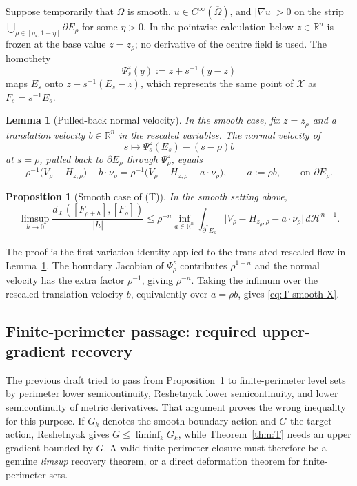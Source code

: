 \documentclass[11pt]{article}
\newtheorem{proposition}[theorem]{Proposition}
\newtheorem{lemma}[theorem]{Lemma}
\theoremstyle{definition}
\newcommand{\R}{\mathbb{R}}
\newcommand{\Om}{\Omega}
\newcommand{\rstar}{\rho_{*}}
\newcommand{\X}{\mathcal X}
\begin{document}
Suppose temporarily that $\Om$ is smooth, $u\in C^\infty(\overline{\Om})$,
and $|\nabla u|>0$ on the strip
$\bigcup_{\rho\in[\rstar,1-\eta]}\partial E_\rho$ for some $\eta>0$.  In the
pointwise calculation below $z\in\R^n$ is frozen at the base value
$z=z_\rho$; no derivative of the centre field is used.  The homothety
\[
   \Psi_s^z(y):=z+s^{-1}(y-z)
\]
maps $E_s$ onto $z+s^{-1}(E_s-z)$, which represents the same point of $\X$ as
$F_s=s^{-1}E_s$.

\begin{lemma}[Pulled-back normal velocity]\label{lem:W}
In the smooth case, fix $z=z_\rho$ and a translation velocity
$b\in\R^n$ in the rescaled variables.  The normal velocity of
\[
   s\longmapsto \Psi_s^z(E_s)-(s-\rho)b
\]
at $s=\rho$, pulled back to $\partial E_\rho$ through $\Psi_\rho^z$, equals
\begin{equation}\label{eq:W}
   \rho^{-1}\bigl(V_\rho-H_{z,\rho}\bigr)-b\cdot\nu_\rho
   =
   \rho^{-1}\bigl(V_\rho-H_{z,\rho}-a\cdot\nu_\rho\bigr),
   \qquad a:=\rho b,
   \qquad\text{on }\partial E_\rho.
\end{equation}
\end{lemma}

\begin{proposition}[Smooth case of (T)]\label{prop:T-smooth}
In the smooth setting above,
\begin{equation}\label{eq:T-smooth-X}
   \limsup_{h\to 0}\frac{d_\X([F_{\rho+h}],[F_\rho])}{|h|}
   \le \rho^{-n}\inf_{a\in\R^n}\int_{\partial^*E_\rho}
       \bigl|V_\rho-H_{z_\rho,\rho}-a\cdot\nu_\rho\bigr|\,d\mathcal H^{n-1}.
\end{equation}
\end{proposition}

The proof is the first-variation identity \cite[\S17.3]{Maggi2012}
applied to the translated rescaled flow in Lemma~\ref{lem:W}.  The boundary
Jacobian of $\Psi_\rho^z$ contributes $\rho^{1-n}$ and the normal velocity
has the extra factor $\rho^{-1}$, giving $\rho^{-n}$.  Taking the infimum over
the rescaled translation velocity $b$, equivalently over $a=\rho b$, gives
\eqref{eq:T-smooth-X}.

\subsection{Finite-perimeter passage: required upper-gradient recovery}
\label{ss:T-bv}

The previous draft tried to pass from Proposition~\ref{prop:T-smooth} to
finite-perimeter level sets by perimeter lower semicontinuity, Reshetnyak
lower semicontinuity, and lower semicontinuity of metric derivatives.  That
argument proves the wrong inequality for this purpose.  If $G_k$ denotes the
smooth boundary action and $G$ the target action, Reshetnyak gives
$G\le\liminf_k G_k$, while Theorem~\ref{thm:T} needs an upper gradient bounded
by $G$.  A valid finite-perimeter closure must therefore be a genuine
\emph{limsup} recovery theorem, or a direct deformation theorem for
finite-perimeter sets.
\end{document}
